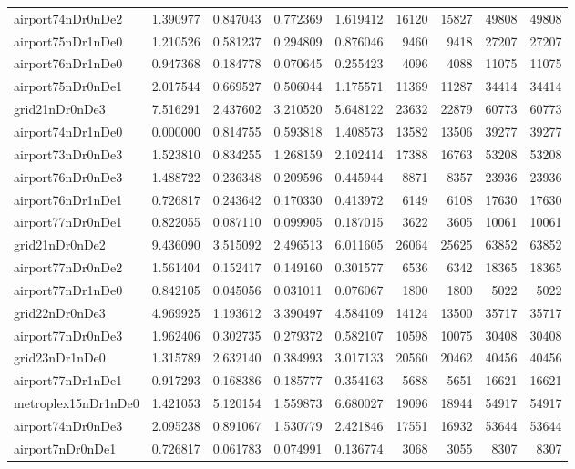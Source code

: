 \begin{longtable}{|l|r|r|r|r|r|r|r|r|}
airport74nDr0nDe2 & 1.390977 & 0.847043 & 0.772369 & 1.619412 & 16120 & 15827 & 49808 & 49808 \\
airport75nDr1nDe0 & 1.210526 & 0.581237 & 0.294809 & 0.876046 & 9460 & 9418 & 27207 & 27207 \\
airport76nDr1nDe0 & 0.947368 & 0.184778 & 0.070645 & 0.255423 & 4096 & 4088 & 11075 & 11075 \\
airport75nDr0nDe1 & 2.017544 & 0.669527 & 0.506044 & 1.175571 & 11369 & 11287 & 34414 & 34414 \\
grid21nDr0nDe3 & 7.516291 & 2.437602 & 3.210520 & 5.648122 & 23632 & 22879 & 60773 & 60773 \\
airport74nDr1nDe0 & 0.000000 & 0.814755 & 0.593818 & 1.408573 & 13582 & 13506 & 39277 & 39277 \\
airport73nDr0nDe3 & 1.523810 & 0.834255 & 1.268159 & 2.102414 & 17388 & 16763 & 53208 & 53208 \\
airport76nDr0nDe3 & 1.488722 & 0.236348 & 0.209596 & 0.445944 & 8871 & 8357 & 23936 & 23936 \\
airport76nDr1nDe1 & 0.726817 & 0.243642 & 0.170330 & 0.413972 & 6149 & 6108 & 17630 & 17630 \\
airport77nDr0nDe1 & 0.822055 & 0.087110 & 0.099905 & 0.187015 & 3622 & 3605 & 10061 & 10061 \\
grid21nDr0nDe2 & 9.436090 & 3.515092 & 2.496513 & 6.011605 & 26064 & 25625 & 63852 & 63852 \\
airport77nDr0nDe2 & 1.561404 & 0.152417 & 0.149160 & 0.301577 & 6536 & 6342 & 18365 & 18365 \\
airport77nDr1nDe0 & 0.842105 & 0.045056 & 0.031011 & 0.076067 & 1800 & 1800 & 5022 & 5022 \\
grid22nDr0nDe3 & 4.969925 & 1.193612 & 3.390497 & 4.584109 & 14124 & 13500 & 35717 & 35717 \\
airport77nDr0nDe3 & 1.962406 & 0.302735 & 0.279372 & 0.582107 & 10598 & 10075 & 30408 & 30408 \\
grid23nDr1nDe0 & 1.315789 & 2.632140 & 0.384993 & 3.017133 & 20560 & 20462 & 40456 & 40456 \\
airport77nDr1nDe1 & 0.917293 & 0.168386 & 0.185777 & 0.354163 & 5688 & 5651 & 16621 & 16621 \\
metroplex15nDr1nDe0 & 1.421053 & 5.120154 & 1.559873 & 6.680027 & 19096 & 18944 & 54917 & 54917 \\
airport74nDr0nDe3 & 2.095238 & 0.891067 & 1.530779 & 2.421846 & 17551 & 16932 & 53644 & 53644 \\
airport7nDr0nDe1 & 0.726817 & 0.061783 & 0.074991 & 0.136774 & 3068 & 3055 & 8307 & 8307 \\

\end{longtable}
